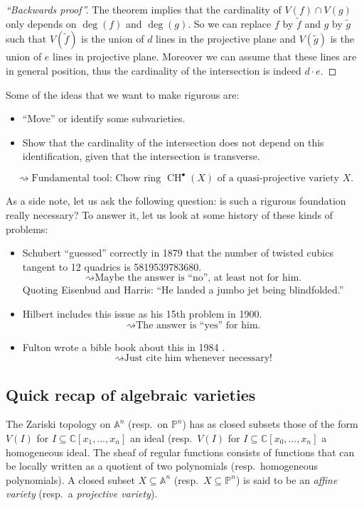 \documentclass[12pt,a4paper]{amsart}
\theoremstyle{plain}
\theoremstyle{definition}
\theoremstyle{remark}
\begin{document}
\begin{proof}[``Backwards proof'']
    The theorem implies that the cardinality of $V(f)\cap V(g)$ only depends on $\deg(f)$ and $\deg(g)$.
    So we can replace $f$ by $\tilde{f}$ and $g$ by $\tilde{g}$ such that $V(\tilde{f})$ is the union of $d$ lines in the projective plane and $V(\tilde{g})$ is the union of $e$ lines in projective plane.
    Moreover we can assume that these lines are in general position, thus the cardinality of the intersection is indeed $d\cdot e$.
\end{proof}

Some of the ideas that we want to make rigurous are:

\begin{itemize}
    \item ``Move'' or identify some subvarieties.
    \item Show that the cardinality of the intersection does not depend on this identification, given that the intersection is transverse.
\end{itemize}

\[ \rightsquigarrow \text{Fundamental tool: Chow ring }\operatorname{CH}^{\bullet}(X)\text{ of a quasi-projective variety } X.\]

As a side note, let us ask the following question: is such a rigurous foundation really necessary?
To answer it, let us look at some history of these kinds of problems:

\begin{itemize}
    \item Schubert ``guessed'' correctly in 1879 that the number of twisted cubics tangent to 12 quadrics is 5819539783680.
	\[ \rightsquigarrow \text{Maybe the answer is ``no'', at least not for him.} \]
	Quoting Eisenbud and Harris: ``He landed a jumbo jet being blindfolded.''
    \item Hilbert includes this issue as his 15th problem in 1900.
	\[ \rightsquigarrow \text{The answer is ``yes'' for him.} \]
    \item Fulton wrote a bible book about this in 1984 \cite{ful98}.
	\[ \rightsquigarrow \text{Just cite him whenever necessary!} \]
\end{itemize}

\subsection{Quick recap of algebraic varieties}

The Zariski topology on $\mathbb{A}^{n}$ (resp.~on $\mathbb{P}^{n}$) has as closed subsets those of the form $V(I)$ for $I\subseteq \mathbb{C}[x_{1},\ldots,x_{n}]$ an ideal (resp.~$V(I)$ for $I\subseteq \mathbb{C}[x_{0},\ldots,x_{n}]$ a homogeneous ideal.
The sheaf of regular functions consists of functions that can be locally written as a quotient of two polynomials (resp.~homogeneous polynomials).
A closed subset $X\subseteq \mathbb{A}^{n}$ (resp.~$X\subseteq \mathbb{P}^{n}$) is said to be an \textit{affine variety} (resp.~a \textit{projective variety}).
\end{document}
